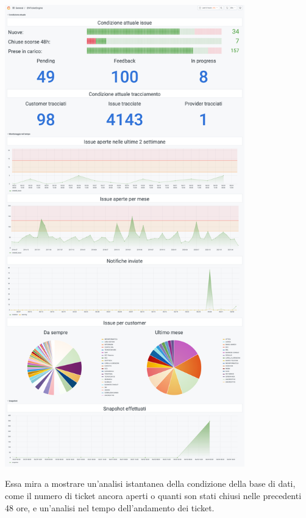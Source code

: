 			\begin{center}
				\includegraphics[keepaspectratio = true, height=20cm]{immagini/dashboard.png}
			\end{center}
			Essa mira a mostrare un'analisi istantanea della condizione della base di dati, come il numero di ticket ancora aperti o quanti son stati chiusi nelle precedenti 48 ore, e un'analisi nel tempo dell'andamento dei ticket.
